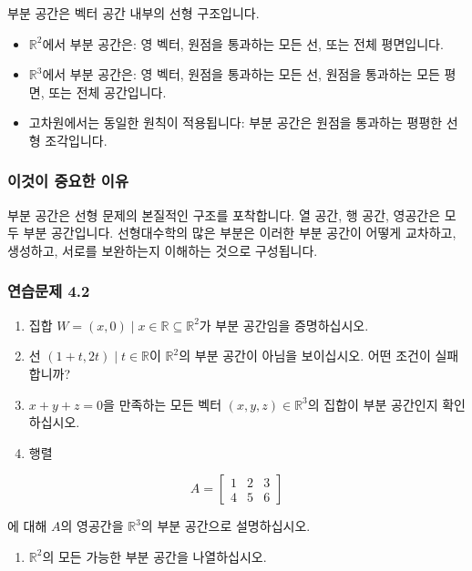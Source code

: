 \documentclass[
  12pt,
  a4paper,
]{article}
\begin{document}
부분 공간은 벡터 공간 내부의 선형 구조입니다.

\begin{itemize}
\item
  \(\mathbb{R}^2\)에서 부분 공간은: 영 벡터, 원점을 통과하는 모든 선, 또는 전체 평면입니다.
\item
  \(\mathbb{R}^3\)에서 부분 공간은: 영 벡터, 원점을 통과하는 모든 선, 원점을 통과하는 모든 평면, 또는 전체 공간입니다.
\item
  고차원에서는 동일한 원칙이 적용됩니다: 부분 공간은 원점을 통과하는 평평한 선형 조각입니다.
\end{itemize}

\subsubsection{이것이 중요한 이유}\label{why-this-matters-13}

부분 공간은 선형 문제의 본질적인 구조를 포착합니다. 열 공간, 행 공간, 영공간은 모두 부분 공간입니다. 선형대수학의 많은 부분은 이러한 부분 공간이 어떻게 교차하고, 생성하고, 서로를 보완하는지 이해하는 것으로 구성됩니다.

\subsubsection{연습문제 4.2}\label{exercises-42}

\begin{enumerate}
\def\labelenumi{\arabic{enumi}.}
\item
  집합 \(W = { (x,0) \mid x \in \mathbb{R} } \subseteq \mathbb{R}^2\)가 부분 공간임을 증명하십시오.
\item
  선 \({ (1+t, 2t) \mid t \in \mathbb{R} }\)이 \(\mathbb{R}^2\)의 부분 공간이 아님을 보이십시오. 어떤 조건이 실패합니까?
\item
  \(x+y+z=0\)을 만족하는 모든 벡터 \((x,y,z) \in \mathbb{R}^3\)의 집합이 부분 공간인지 확인하십시오.
\item
  행렬
\end{enumerate}

\[A = \begin{bmatrix}
1 & 2 & 3 \\
4 & 5 & 6
\end{bmatrix}\]

에 대해 \(A\)의 영공간을 \(\mathbb{R}^3\)의 부분 공간으로 설명하십시오.

\begin{enumerate}
\def\labelenumi{\arabic{enumi}.}
\item
  \(\mathbb{R}^2\)의 모든 가능한 부분 공간을 나열하십시오.
\end{enumerate}
\end{document}
